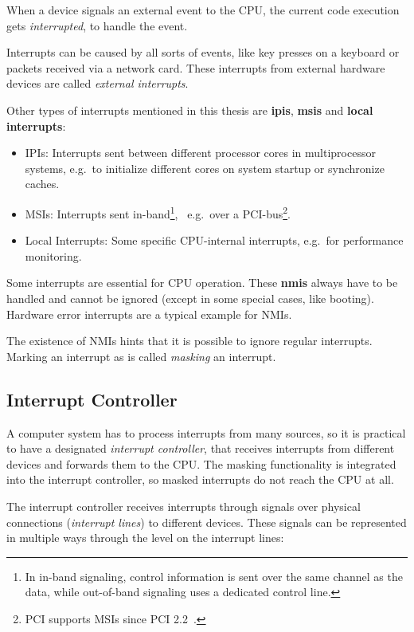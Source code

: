 When a device signals an external event to the CPU, the current code execution gets \textit{interrupted}, to handle the event.

Interrupts can be caused by all sorts of events, like key presses on a keyboard or packets received via a network card.
These interrupts from external hardware devices are called \textit{external interrupts}.

Other types of interrupts mentioned in this thesis are \textbf{\glspl{ipi}}, \textbf{\glspl{msi}} and \textbf{\glspl{local interrupt}}:

\begin{itemize}
  \item IPIs: Interrupts sent between different processor cores in multiprocessor systems, e.g.\ to initialize different cores on system startup or synchronize caches.
  \item MSIs: Interrupts sent in-band\footnote{
          In in-band signaling, control information is sent over the same channel as the data, while out-of-band signaling uses a dedicated control line.},
        \ e.g.\ over a PCI-bus\footnote{
          PCI supports MSIs since PCI 2.2~\autocite[sec.~6.8]{pci22}.}.
  \item Local Interrupts: Some specific CPU-internal interrupts, e.g.\ for performance monitoring.
\end{itemize}

Some interrupts are essential for CPU operation.
These \textbf{\glspl{nmi}} always have to be handled and cannot be ignored (except in some special cases, like booting).
Hardware error interrupts are a typical example for NMIs.

The existence of NMIs hints that it is possible to ignore regular interrupts.
Marking an interrupt as  is called \textit{masking} an interrupt.

\subsection{Interrupt Controller}
\label{subsec:controller}

A computer system has to process interrupts from many sources, so it is practical to have a designated \textit{interrupt controller}, that receives interrupts from different devices and forwards them to the CPU\@.
The masking functionality is integrated into the interrupt controller, so masked interrupts do not reach the CPU at all.

The interrupt controller receives interrupts through signals over physical connections (\textit{interrupt lines}) to different devices.
These signals can be represented in multiple ways through the level on the interrupt lines:

